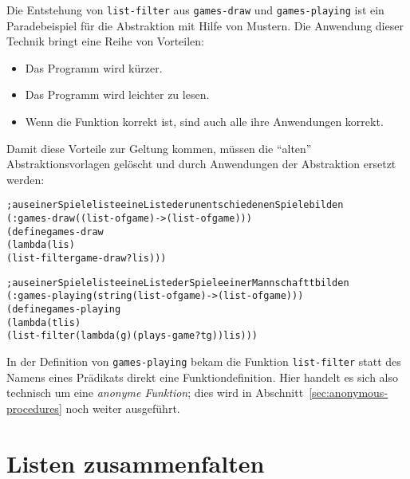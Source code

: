 Die Entstehung von \texttt{list-filter} aus \texttt{games-draw} und
\texttt{games-playing} ist ein Paradebeispiel für die Abstraktion mit
Hilfe von Mustern.  Die Anwendung dieser Technik bringt eine Reihe von
Vorteilen:
%
\begin{itemize}
\item Das Programm wird kürzer.
\item Das Programm wird leichter zu lesen.
\item Wenn die Funktion korrekt ist, sind auch alle ihre Anwendungen
  korrekt.
\end{itemize}
%
Damit diese Vorteile zur Geltung kommen, müssen die "`alten"'
Abstraktionsvorlagen gelöscht und durch Anwendungen der Abstraktion
ersetzt werden:
%
\begin{alltt}
; aus einer Spieleliste eine Liste der unentschiedenen Spiele bilden
(: games-draw ((list-of game) -> (list-of game)))
(define games-draw
  (lambda (lis)
    (list-filter game-draw? lis)))

; aus einer Spieleliste eine Liste der Spiele einer Mannschaft t bilden
(: games-playing (string (list-of game) -> (list-of game)))
(define games-playing
  (lambda (t lis)
    (list-filter (lambda (g) (plays-game? t g)) lis)))
\end{alltt}
%
In der Definition von \texttt{games-playing} bekam die Funktion
\texttt{list-filter} statt des Namens eines Prädikats direkt eine
Funktiondefinition.  Hier handelt es sich also technisch um eine \emph{anonyme
  Funktion}; dies wird in Abschnitt~\ref{sec:anonymous-procedures} noch weiter ausgeführt.

\section{Listen zusammenfalten}

